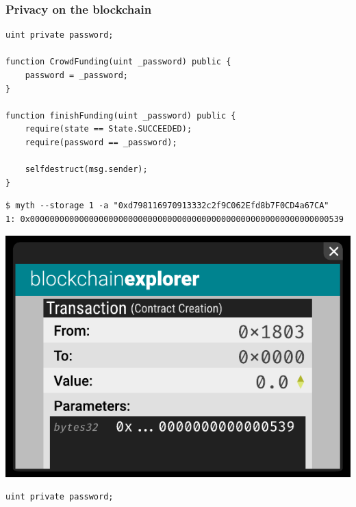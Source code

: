 \documentclass[xcolor=x11names,compress]{beamer}
\begin{document}
\begin{frame}[fragile]
	\frametitle{Privacy on the blockchain}
	\begin{overprint}
		\begin{minipage}[c][0.7\textheight][c]{\textwidth}
			\begin{verbatim}
uint private password;

function CrowdFunding(uint _password) public {
    password = _password;
}

function finishFunding(uint _password) public {
    require(state == State.SUCCEEDED);
    require(password == _password);
    
    selfdestruct(msg.sender);
}
    \end{verbatim}
		\end{minipage}
		\begin{minipage}[c][0.7\textheight][c]{\textwidth}
			\tiny
			\begin{verbatim}
$ myth --storage 1 -a "0xd798116970913332c2f9C062Efd8b7F0CD4a67CA"
1: 0x0000000000000000000000000000000000000000000000000000000000000539
			\end{verbatim}
		\end{minipage}
		\begin{center}
			\includegraphics[width=\textwidth,height=0.8\textheight,keepaspectratio]{img/blockchainexplorers/02.pdf}
		\end{center}
		\begin{minipage}[c][0.7\textheight][c]{\textwidth}
			\begin{verbatim}
uint private password;


\end{verbatim}
\end{minipage}
\end{overprint}
\end{frame}
\end{document}
